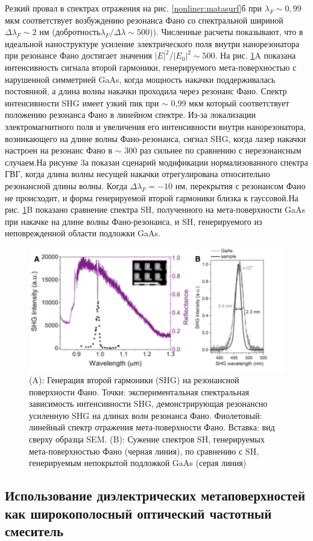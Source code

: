 Резкий провал в спектрах отражения на рис. \ref{nonliner:matasurf}б при $\lambda_{F} \sim0,99$  мкм соответствует возбуждению резонанса Фано со спектральной шириной $\Delta\lambda_{F} \sim 2$ нм (добротность$\lambda_{F} /\Delta\lambda \sim 500$)). Численные расчеты показывают, что в идеальной наноструктуре усиление электрического поля внутри нанорезонатора при резонансе Фано достигает значения $|E|^2/|E_{0}|^2 \sim 500$. На рис. \ref{nonliner:matasurf2}A показана интенсивность сигнала второй гармоники, генерируемого мета-поверхностью с нарушенной симметрией GaAs, когда мощность накачки поддерживалась постоянной, а длина волны накачки проходила через резонанс Фано. Спектр интенсивности SHG имеет узкий пик при $\sim$ 0,99 мкм который соответствует положению резонанса Фано в линейном спектре. Из-за локализации электромагнитного поля и увеличения его интенсивности внутри нанорезонатора, возникающего на длине волны Фано-резонанса, сигнал SHG, когда лазер накачки настроен на резонанс Фано в  $\sim$ 300 раз сильнее по сравнению с нерезонансным случаем.На рисунке 3а показан сценарий модификации нормализованного спектра ГВГ, когда длина волны несущей накачки отрегулирована относительно резонансной длины волны. Когда $\Delta\lambda_{F} = -10$ нм, перекрытия с резонансом Фано не происходит, и форма генерируемой второй гармоники близка к гауссовой.На рис. \ref{nonliner:matasurf2}B показано сравнение спектра SH, полученного на мета-поверхности GaAs при накачке на длине волны Фано-резонанса, и SH, генерируемого из неповрежденной области подложки GaAs. 
 \begin{figure}[h!]
	\centering
	\includegraphics[width=0.7\linewidth]{images/fig7.png}
	\caption{(A): Генерация второй гармоники (SHG) на резонансной поверхности Фано. Точки: экспериментальная спектральная зависимость интенсивности SHG, демонстрирующая резонансно усиленную SHG на длинах волн резонанса Фано. Фиолетовый: линейный спектр отражения мета-поверхности Фано. Вставка: вид сверху образца SEM. (B): Сужение спектров SH, генерируемых мета-поверхностью Фано (черная линия), по сравнению с SH, генерируемым непокрытой подложкой GaAs (серая линия)}
	\label{nonliner:matasurf2}
\end{figure}


\subsection*{Использование диэлектрических метаповерхностей как широкополосный оптический частотный смеситель}


